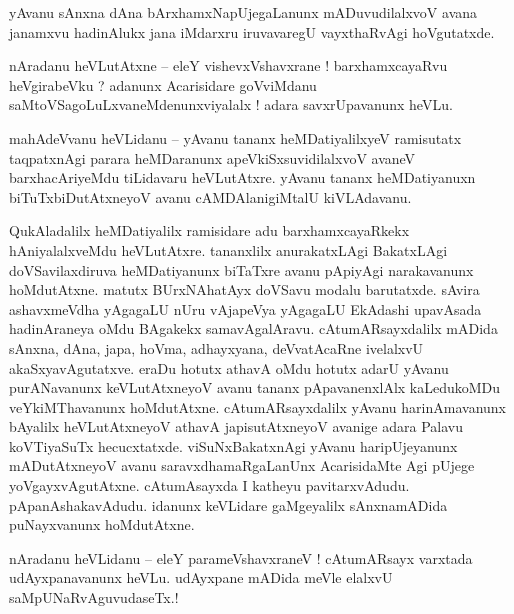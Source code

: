 \documentclass{article}
\begin{document}
\begin{mn}%
yAvanu sAnxna dAna bArxhamxNapUjegaLanunx mADuvudilalxvoV avana janamxvu hadinAlukx jana iMdarxru 
iruvavaregU vayxthaRvAgi hoVgutatxde.
\end{mn}

\begin{mn}%
nAradanu heVLutAtxne -- eleY vishevxVshavxrane ! barxhamxcayaRvu heVgirabeVku ? adanunx Acarisidare 
goVviMdanu saMtoVSagoLuLxvaneMdenunxviyalalx ! adara savxrUpavanunx heVLu.
\end{mn}

\begin{mn}%
mahAdeVvanu heVLidanu -- yAvanu tananx heMDatiyalilxyeV ramisutatx taqpatxnAgi parara heMDaranunx 
apeVkiSxsuvidilalxvoV avaneV barxhacAriyeMdu tiLidavaru heVLutAtxre. yAvanu tananx heMDatiyanuxn 
biTuTxbiDutAtxneyoV avanu cAMDAlanigiMtalU kiVLAdavanu.
\end{mn}

\begin{mn}%
QukAladalilx heMDatiyalilx ramisidare adu barxhamxcayaRkekx hAniyalalxveMdu heVLutAtxre. tananxlilx 
anurakatxLAgi BakatxLAgi doVSavilaxdiruva heMDatiyanunx biTaTxre avanu pApiyAgi narakavanunx 
hoMdutAtxne. matutx BUrxNAhatAyx doVSavu modalu barutatxde. sAvira ashavxmeVdha yAgagaLU nUru 
vAjapeVya yAgagaLU EkAdashi upavAsada hadinAraneya oMdu BAgakekx samavAgalAravu. cAtumARsayxdalilx 
mADida sAnxna, dAna, japa, hoVma, adhayxyana, deVvatAcaRne ivelalxvU akaSxyavAgutatxve. eraDu 
hotutx athavA oMdu hotutx adarU yAvanu purANavanunx keVLutAtxneyoV avanu tananx pApavanenxlAlx 
kaLedukoMDu veYkiMThavanunx hoMdutAtxne. cAtumARsayxdalilx yAvanu harinAmavanunx bAyalilx 
heVLutAtxneyoV athavA japisutAtxneyoV avanige adara Palavu koVTiyaSuTx hecucxtatxde. 
viSuNxBakatxnAgi yAvanu haripUjeyanunx mADutAtxneyoV avanu saravxdhamaRgaLanUnx AcarisidaMte Agi 
pUjege yoVgayxvAgutAtxne. cAtumAsayxda I katheyu pavitarxvAdudu. pApanAshakavAdudu. idanunx 
keVLidare gaMgeyalilx sAnxnamADida puNayxvanunx hoMdutAtxne.
\end{mn}


\begin{mn}%
nAradanu heVLidanu -- eleY parameVshavxraneV ! cAtumARsayx varxtada udAyxpanavanunx heVLu. 
udAyxpane mADida meVle elalxvU saMpUNaRvAguvudaseTx.!
\end{mn}
\end{document}
